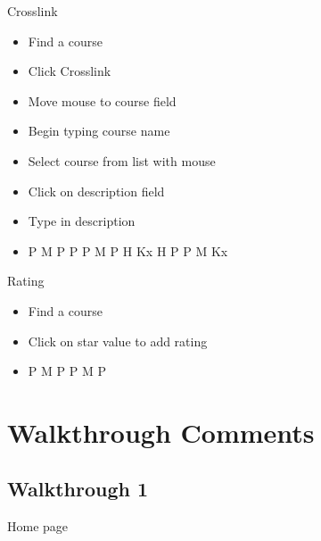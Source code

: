 \documentclass[12pt]{report}
\begin{document}
Crosslink
\begin{itemize}
\item Find a course
\item Click Crosslink
\item Move mouse to course field
\item Begin typing course name
\item Select course from list with mouse
\item Click on description field
\item Type in description 
\item P M P P P M P H Kx H P P M Kx
\end{itemize}
Rating
\begin{itemize}
\item Find a course
\item Click on star value to add rating
\item P M P P M P
\end{itemize}

\section{Walkthrough Comments}

\subsection{Walkthrough 1}
Home page
\end{document}
